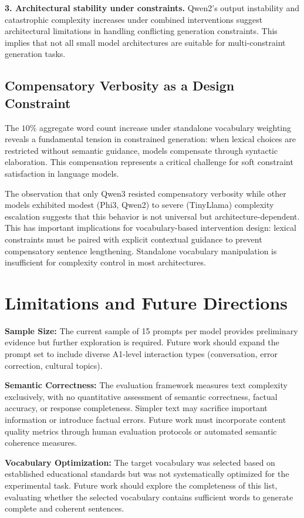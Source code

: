 \documentclass[10pt, a4paper]{article}
\begin{document}
\textbf{3. Architectural stability under constraints.} Qwen2's output instability and catastrophic complexity increases under combined interventions suggest architectural limitations in handling conflicting generation constraints. This implies that not all small model architectures are suitable for multi-constraint generation tasks.

\subsection{Compensatory Verbosity as a Design Constraint}

The $10\%$ aggregate word count increase under standalone vocabulary weighting reveals a fundamental tension in constrained generation: when lexical choices are restricted without semantic guidance, models compensate through syntactic elaboration. This compensation represents a critical challenge for soft constraint satisfaction in language models.

The observation that only Qwen3 resisted compensatory verbosity while other models exhibited modest (Phi3, Qwen2) to severe (TinyLlama) complexity escalation suggests that this behavior is not universal but architecture-dependent. This has important implications for vocabulary-based intervention design: lexical constraints must be paired with explicit contextual guidance to prevent compensatory sentence lengthening. Standalone vocabulary manipulation is insufficient for complexity control in most architectures.

\section{Limitations and Future Directions}

\textbf{Sample Size:} The current sample of 15 prompts per model provides preliminary evidence but further exploration is required. Future work should expand the prompt set to include diverse A1-level interaction types (conversation, error correction, cultural topics).

\textbf{Semantic Correctness:} The evaluation framework measures text complexity exclusively, with no quantitative assessment of semantic correctness, factual accuracy, or response completeness. Simpler text may sacrifice important information or introduce factual errors. Future work must incorporate content quality metrics through human evaluation protocols or automated semantic coherence measures.

\textbf{Vocabulary Optimization:} The target vocabulary was selected based on established educational standards but was not systematically optimized for the experimental task. Future work should explore the completeness of this list, evaluating whether the selected vocabulary contains sufficient words to generate complete and coherent sentences.
\end{document}
